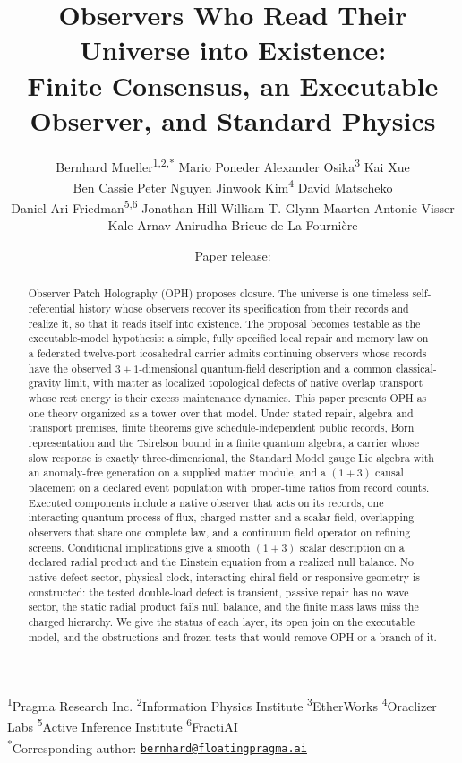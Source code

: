\documentclass[11pt]{article}
\title{Observers Who Read Their Universe into Existence:\\
Finite Consensus, an Executable Observer, and Standard Physics}
\author{%
\normalsize Bernhard Mueller\textsuperscript{1,2,*}\qquad
\normalsize Mario Poneder\qquad
\normalsize Alexander Osika\textsuperscript{3}\qquad
\normalsize Kai Xue\\[0.5em]
\normalsize Ben Cassie\qquad
\normalsize Peter Nguyen\qquad
\normalsize Jinwook Kim\textsuperscript{4}\qquad
\normalsize David Matscheko\\[0.5em]
\normalsize Daniel Ari Friedman\textsuperscript{5,6}\qquad
\normalsize Jonathan Hill\qquad
\normalsize William T. Glynn\qquad
\normalsize Maarten Antonie Visser\\[0.5em]
\normalsize Kale Arnav Anirudha\qquad
\normalsize Brieuc de La Fourni\`ere}
\date{\small\OPHPaperReleaseDate\quad\textperiodcentered\quad Paper release: \OPHPaperReleaseID}
\theoremstyle{definition}
\theoremstyle{remark}
\begin{document}
\maketitle

\begin{center}
\footnotesize
\textsuperscript{1}Pragma Research Inc.\quad
\textsuperscript{2}Information Physics Institute\quad
\textsuperscript{3}EtherWorks\quad
\textsuperscript{4}Oraclizer Labs\quad
\textsuperscript{5}Active Inference Institute\quad
\textsuperscript{6}FractiAI\\
\textsuperscript{*}Corresponding author:
\href{mailto:bernhard@floatingpragma.ai}{\nolinkurl{bernhard@floatingpragma.ai}}
\end{center}

\begin{abstract}
Observer Patch Holography (OPH) proposes closure. The universe is one
timeless self-referential history whose observers recover its specification
from their records and realize it, so that it reads itself into existence.
The proposal becomes testable as the executable-model hypothesis: a simple,
fully specified local repair and memory law on a federated twelve-port
icosahedral carrier admits continuing observers whose records have the
observed $3+1$-dimensional quantum-field description and a common
classical-gravity limit, with matter as localized topological defects of
native overlap transport whose rest energy is their excess maintenance
dynamics. This paper presents OPH as one theory organized as a tower over
that model. Under stated repair, algebra and transport premises, finite
theorems give schedule-independent public records, Born representation and
the Tsirelson bound in a finite quantum algebra, a carrier whose slow
response is exactly three-dimensional, the Standard Model gauge Lie algebra
with an anomaly-free generation on a supplied matter module, and a
$(1+3)$ causal placement on a declared event population with proper-time
ratios from record counts. Executed components include a native observer that acts on
its records, one interacting quantum process of flux, charged matter and a
scalar field, overlapping observers that share one complete law, and a
continuum field operator on refining screens. Conditional implications give
a smooth $(1+3)$ scalar description on a declared radial product and the
Einstein equation from a realized null balance. No native defect sector,
physical clock, interacting chiral field or responsive geometry is
constructed: the tested double-load defect is transient, passive repair has
no wave sector, the static radial product fails null balance, and the finite
mass laws miss the charged hierarchy. We give the status of each layer, its
open join on the executable model, and the obstructions and frozen tests
that would remove OPH or a branch of it.
\end{abstract}
\end{document}
